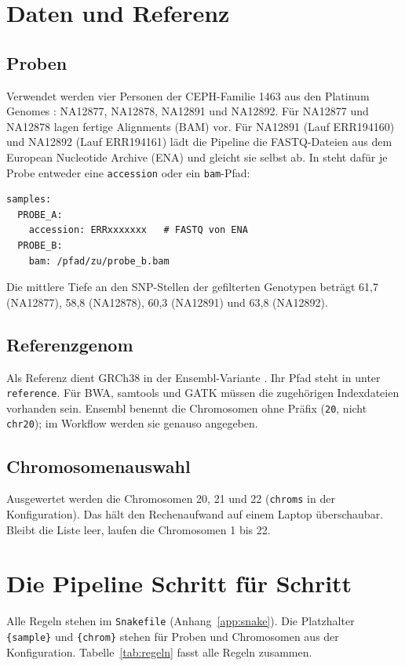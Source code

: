 \documentclass[10pt,a4paper,twocolumn]{article}
\begin{document}
\section{Daten und Referenz}
\subsection{Proben}
Verwendet werden vier Personen der CEPH-Familie 1463 aus den Platinum Genomes \citep{eberle2017}: NA12877, NA12878, NA12891 und NA12892. Für NA12877 und NA12878 lagen fertige Alignments (BAM) vor. Für NA12891 (Lauf ERR194160) und NA12892 (Lauf ERR194161) lädt die Pipeline die FASTQ-Dateien aus dem European Nucleotide Archive (ENA) und gleicht sie selbst ab. In  steht dafür je Probe entweder eine \texttt{accession} oder ein \texttt{bam}-Pfad:
\begin{lstlisting}
samples:
  PROBE_A:
    accession: ERRxxxxxxx   # FASTQ von ENA
  PROBE_B:
    bam: /pfad/zu/probe_b.bam
\end{lstlisting}
Die mittlere Tiefe an den SNP-Stellen der gefilterten Genotypen beträgt 61,7 (NA12877), 58,8 (NA12878), 60,3 (NA12891) und 63,8 (NA12892).

\subsection{Referenzgenom}
Als Referenz dient GRCh38 in der Ensembl-Variante . Ihr Pfad steht in  unter \texttt{reference}. Für BWA, samtools und GATK müssen die zugehörigen Indexdateien vorhanden sein. Ensembl benennt die Chromosomen ohne Präfix (\texttt{20}, nicht \texttt{chr20}); im Workflow werden sie genauso angegeben.

\subsection{Chromosomenauswahl}
Ausgewertet werden die Chromosomen 20, 21 und 22 (\texttt{chroms} in der Konfiguration). Das hält den Rechenaufwand auf einem Laptop überschaubar. Bleibt die Liste leer, laufen die Chromosomen 1 bis 22.

\section{Die Pipeline Schritt für Schritt}
Alle Regeln stehen im \texttt{Snakefile} (Anhang~\ref{app:snake}). Die Platzhalter \texttt{\{sample\}} und \texttt{\{chrom\}} stehen für Proben und Chromosomen aus der Konfiguration. Tabelle~\ref{tab:regeln} fasst alle Regeln zusammen.
\end{document}
